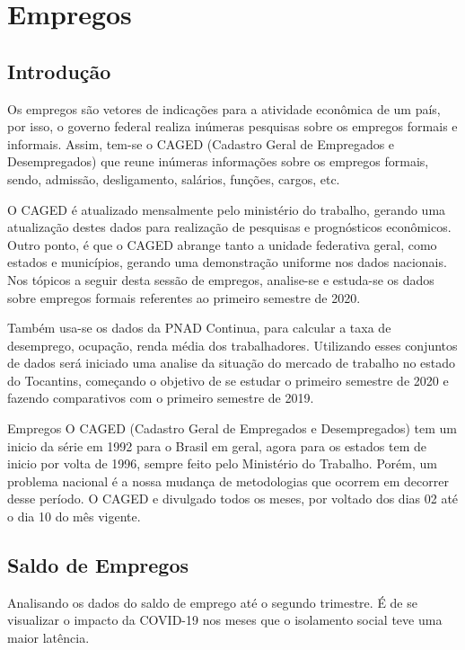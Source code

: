 \chapter{Empregos}
\section{Introdução}
\par Os empregos são  vetores de indicações para a atividade econômica de um país, por isso, o governo federal realiza inúmeras pesquisas sobre os empregos formais e informais. Assim, tem-se o CAGED (Cadastro Geral de Empregados e Desempregados) que reune inúmeras informações sobre os empregos formais, sendo, admissão, desligamento, salários, funções, cargos, etc.
\par O CAGED é atualizado mensalmente pelo ministério do trabalho, gerando uma atualização destes dados para realização de pesquisas e prognósticos econômicos. Outro ponto, é que o CAGED abrange tanto a unidade federativa geral, como estados e municípios, gerando uma demonstração uniforme nos dados nacionais. Nos tópicos a seguir desta sessão de empregos, analise-se e estuda-se os dados sobre empregos formais referentes ao primeiro semestre de 2020.
\par Também usa-se os dados da PNAD Continua, para calcular a taxa de desemprego, ocupação, renda média dos trabalhadores. Utilizando esses conjuntos de dados será iniciado uma analise da situação do mercado de trabalho no estado do Tocantins, começando  o objetivo de se estudar o primeiro semestre de 2020 e fazendo comparativos com o primeiro semestre de 2019.

\begin{smbox}[label={labelbox},nameref={Empregos}]{Empregos}
O CAGED (Cadastro Geral de Empregados e Desempregados) tem um inicio da série em 1992 para o Brasil em geral, agora para os estados tem de inicio por volta de 1996, sempre feito pelo Ministério do Trabalho. Porém, um problema nacional é a nossa mudança de metodologias que ocorrem em decorrer desse período. O CAGED e divulgado todos os meses, por voltado dos dias 02 até o dia 10 do mês vigente.
\end{smbox}

\section{Saldo de Empregos}
\par Analisando os dados do saldo de emprego até o segundo trimestre. É de se visualizar o impacto da COVID-19 nos meses que o isolamento social teve uma maior latência.

